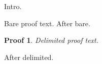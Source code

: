 \documentclass{article}
\theoremstyle{nonumberplain}
\newtheorem{Proof}{Proof}
\begin{document}
Intro.

{\Proof Bare proof text.} After bare.

\begin{Proof} Delimited proof text. \end{Proof}
After delimited.
\end{document}
